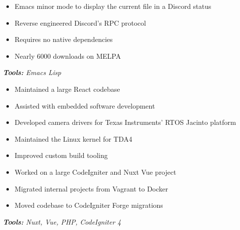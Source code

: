 \documentclass[10pt,letter]{altacv}
\begin{document}
\divider

\begin{itemize}
\item Emacs minor mode to display the current file in a Discord status
\item Reverse engineered Discord's RPC protocol
\item Requires no native dependencies
\item Nearly 6000 downloads on MELPA
\end{itemize}
\textit{\textbf{Tools:} Emacs Lisp}

\smallskip


\begin{itemize}
  \item Maintained a large React codebase
  \item Assisted with embedded software development
\end{itemize}

\divider

\begin{itemize}
  \item Developed camera drivers for Texas Instruments' RTOS Jacinto platform
  \item Maintained the Linux kernel for TDA4
  \item Improved custom build tooling
\end{itemize}

\divider

\begin{itemize}
  \item Worked on a large CodeIgniter and Nuxt Vue project
  \item Migrated internal projects from Vagrant to Docker
  \item Moved codebase to CodeIgniter Forge migrations
\end{itemize}
\textit{\textbf{Tools:} Nuxt, Vue, PHP, CodeIgniter 4}

\clearpage
\end{document}

